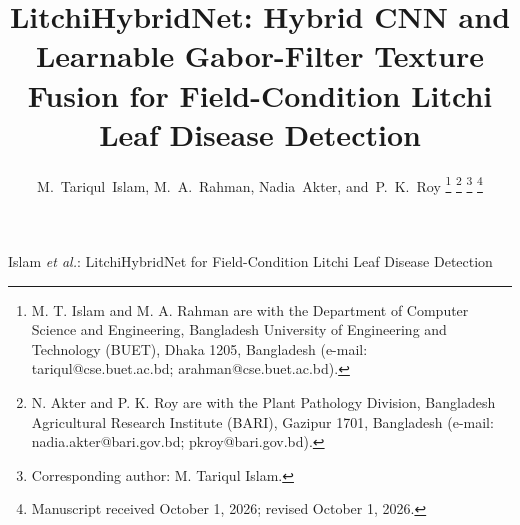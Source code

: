 \documentclass[journal]{IEEEtran}
\begin{document}
\title{LitchiHybridNet: Hybrid CNN and Learnable Gabor-Filter Texture Fusion for Field-Condition Litchi Leaf Disease Detection}

\author{M.~Tariqul~Islam,
        M.~A.~Rahman,
        Nadia~Akter,
        and~P.~K.~Roy%
\thanks{M. T. Islam and M. A. Rahman are with the Department of Computer Science and Engineering, Bangladesh University of Engineering and Technology (BUET), Dhaka 1205, Bangladesh (e-mail: tariqul@cse.buet.ac.bd; arahman@cse.buet.ac.bd).}%
\thanks{N. Akter and P. K. Roy are with the Plant Pathology Division, Bangladesh Agricultural Research Institute (BARI), Gazipur 1701, Bangladesh (e-mail: nadia.akter@bari.gov.bd; pkroy@bari.gov.bd).}%
\thanks{Corresponding author: M. Tariqul Islam.}%
\thanks{Manuscript received October 1, 2026; revised October 1, 2026.}}

%
{Islam \MakeLowercase{\textit{et al.}}: LitchiHybridNet for Field-Condition Litchi Leaf Disease Detection}

\maketitle
\end{document}
